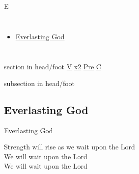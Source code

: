 \documentclass{beamer}
\begin{document}
\begin{frame}{E}
\begin{columns}
    \begin{itemize}
    \item \hyperlink{Everlasting God['Strength will rise']V}{Everlasting God }
\end{itemize}


\end{columns}

\end{frame}

{
{ 
 {
 \begin{beamercolorbox}[ht=4.5ex,dp=1.5ex,%
      leftskip=.3cm,rightskip=.3cm plus1fil]{section in head/foot}
 \fontsize{12}{25}\selectfont 
\hyperlink{Everlasting God['Strength will rise']V}{V}
\hyperlink{Everlasting God['Strength will rise']x2}{x2}
\hyperlink{Everlasting God['Strength will rise']Pre}{Pre}
\hyperlink{Everlasting God['Strength will rise']C}{C}
 
 \end{beamercolorbox}%
  \begin{beamercolorbox}[ht=2.5ex,dp=1.125ex,%
   leftskip=.3cm,rightskip=.3cm plus1fil]{subsection in head/foot}
   \insertauthor
 \end{beamercolorbox}%
 }
}
\subsection{ Everlasting God }

\hypertarget{Everlasting God['Strength will rise']V}{}
\begin{frame}{Everlasting God }
\fontsize{ 18 }{ 23 }\selectfont

Strength will rise as we wait upon the Lord\\ 
We will wait upon the Lord\\ 
We will wait upon the Lord 

\end{frame}

\hypertarget{Everlasting God['Strength will rise']x2}{}
\begin{frame}{}
\fontsize{ 18 }{ 23 }\selectfont

 

\end{frame}

}
\end{document}
